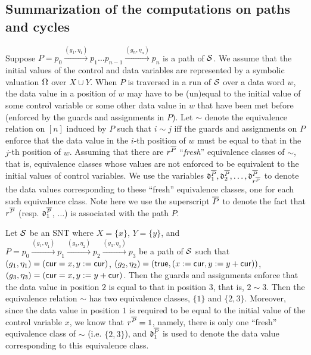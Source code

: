 
\subsection{Summarization of the computations on paths and cycles}\label{sec-sum}

Suppose $P=p_0 \xrightarrow{(g_1,\eta_1)} p_1 \dots p_{n-1} \xrightarrow{(g_n,\eta_n)} p_{n}$ is a path of ${\mathcal{S} }$. We assume that the initial values of the control and data variables are represented by a symbolic valuation $\Omega$ over $X \cup Y$. When $P$ is traversed in a run of ${\mathcal{S} }$ over a data word $w$,  the data value in a position of $w$ may have to be (un)equal to the initial value of some control variable or some other data value in $w$ that have been met before (enforced by the guards and assignments in $P$). Let $\sim$ denote the equivalence relation on $[n]$ induced by $P$ such that $i \sim j$ iff the guards and assignments on $P$ enforce that the data value in the $i$-th position of $w$ must be equal to that in the $j$-th position of $w$. Assuming that there are $r^{\overline{P}}$ ``\emph{fresh}'' equivalence classes of $\sim$, that is, equivalence classes whose values are not enforced to be equivalent to the initial values of control variables. 
We use the variables $\mathfrak{d}^{\overline{P}}_1,\mathfrak{d}^{\overline{P}}_2,\dots, \mathfrak{d}^{\overline{P}}_{r^{\overline{P}}}$ to denote the data values corresponding to these ``fresh'' equivalence classes, one for each such equivalence class. Note here we use the superscript ${\overline{P}}$ to denote the fact that $r^{\overline{P}}$ (resp. $\mathfrak{d}^{\overline{P}}_1$, $\dots$) is associated with the path $P$.

\begin{example}
Let ${\mathcal{S} }$ be an SNT where $X=\{x\}$, $Y=\{y\}$, and $P = p_0 \xrightarrow{(g_1,\eta_1)} p_1 \xrightarrow{(g_2,\eta_2)} p_2  \xrightarrow{(g_3,\eta_3)} p_3$ be a path of ${\mathcal{S} }$ such that $(g_1,\eta_1) = (\mathsf{cur} = x, y:= \mathsf{cur})$, $(g_2,\eta_2)= (\mathsf{true}, (x:=\mathsf{cur}, y:=y+\mathsf{cur}))$, $(g_3,\eta_3)= (\mathsf{cur}=x, y:=y+\mathsf{cur})$. Then  the guards and assignments enforce that the data value in position $2$ is equal to that in position $3$, that is, $2 \sim 3$. Then the equivalence relation $\sim$ has two equivalence classes, $\{1\}$ and $\{2,3\}$. Moreover, since the data value in position $1$ is required to be equal to the initial value of the control variable $x$, we know that $r^{\overline{P}}=1$, namely, there is only one ``fresh'' equivalence class of $\sim$ (i.e. $\{2,3\}$), and $\mathfrak{d}^{\overline{P}}_1$ is used to denote the data value corresponding to this equivalence class.
\end{example}

